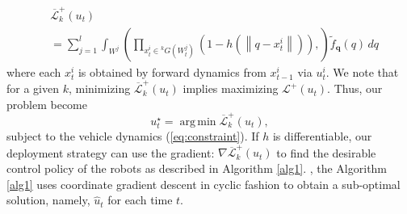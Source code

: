 \documentclass[letterpaper, 10 pt, conference]{ieeeconf}
\DeclareMathOperator*{\argmin}{arg\,min}
\newcommand{\rood}[1]{{\color{red}{[#1]}}}
\begin{document}
\begin{align}
&\overline{\mathcal{L}}_k^+(u_t) 
\nonumber \\
& =\sum_{j = 1}^l \int_{W^j} \left( \prod_{x_t^i \in {}^kG(W_t^j)} \left(1- h \left(\left\|
q - x_t^i \right\|  \right) \right), \right)\widetilde{f}_{\bm{q}}(q)\,dq
\label{cost1}
\end{align}
where each $x_{t}^{i}$ is obtained by forward dynamics from $x_{t-1}^i$ via $u_t^i$. We note that for a given $k$, minimizing $\overline{\mathcal{L}}_k^+(u_t)$ implies maximizing $\mathcal{L}^+(u_t)$.
Thus, our problem become
\begin{equation}
{u}_t^{\star} = \argmin \overline{\mathcal{L}}_k^+(u_t),
\label{mmle}
\end{equation}
subject to the vehicle dynamics (\ref{eq:constraint}). \rood{If $\widetilde{f}_{\bm{q}}$ takes uniform density on $\mathcal{Q}$, then the physical meaning of the problem (\ref{mmle}) is to find control law minimizing the probability that all robots fail to detect target over $\mathcal{Q}$ when $k$ robots are assigned to each region, i.e.,  maximizing the probability that at least one robot can detect target over $\mathcal{Q}$. 
Due to the way we posed the problem, if $k=n$, the solution to \eqref{mmle} guarantees maximum observation likelihood for up to $k-1=n-1$ faults, whereas if $k=1$, the solution does not provide any robustness guarantee even for a single faulty robot.}
If $h$ is differentiable, our deployment strategy can use the gradient: 
$
\nabla \overline{\mathcal{L}}_k^+(u_t) 
$
to find the desirable control policy of the robots as described in Algorithm \ref{alg1}.  \rood{Also, due to the complexity of the problem}, the Algorithm \ref{alg1} uses coordinate gradient descent in cyclic fashion to obtain a sub-optimal solution, namely, $\hat{u}_t$ for each time $t$.
\end{document}
